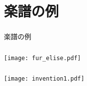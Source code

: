 \documentclass[unicode,17pt]{beamer}
\begin{document}
\section*{楽譜の例}
\begin{frame}\frametitle{}
  \centering
  楽譜の例
\end{frame}

\begin{frame}\frametitle{}
  \centering
  \texttt{[image: fur\_elise.pdf]}
\end{frame}

\begin{frame}\frametitle{}
  \centering
  \texttt{[image: invention1.pdf]}
\end{frame}
\end{document}
